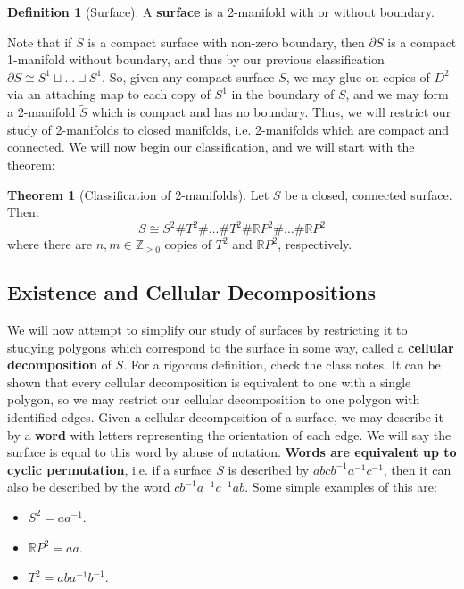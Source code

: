 \documentclass[11pt, oneside]{amsart}   	%
\theoremstyle{definition}
\newtheorem{definition}{Definition}[section]
\newtheorem{theorem}{Theorem}[section]
\begin{document}
	\begin{definition}[Surface]
		A \textbf{surface} is a 2-manifold with or without boundary.
	\end{definition}
	
	Note that if $S$ is a compact surface with non-zero boundary, then $\partial S$ is a compact 1-manifold without boundary, and thus by our previous 
	classification $\partial S\cong S^1\sqcup ...\sqcup S^1$. So, given any compact surface $S$, we may glue on copies of $D^2$ via an attaching map to each 
	copy of $S^1$ in the boundary of $S$, and we may form a 2-manifold $\tilde S$ which is compact and has no boundary. Thus, we will restrict our study of 
	2-manifolds to closed manifolds, i.e. 2-manifolds which are compact and connected. We will now begin our classification, and we will start with the theorem:
	
	\begin{theorem}[Classification of 2-manifolds]
		Let $S$ be a closed, connected surface. Then:
		$$
			S\cong S^2\# T^2\# ...\# T^2\#\mathbb RP^2\# ...\#\mathbb RP^2
		$$
		where there are $n, m\in\mathbb Z_{\geq 0}$ copies of $T^2$ and $\mathbb RP^2$, respectively.
	\end{theorem}
	
	\subsection{Existence and Cellular Decompositions}
	
	We will now attempt to simplify our study of surfaces by restricting it to studying polygons which correspond to the surface in some way, called a \textbf{cellular 
	decomposition} of $S$. For a rigorous definition, check the class notes. It can be shown that every cellular decomposition is equivalent to one with a single 
	polygon, so we may restrict our cellular decomposition to one polygon with identified edges. Given a cellular decomposition of a surface, we may describe it by 
	a \textbf{word} with letters representing the orientation of each edge. We will say the surface is equal to this word by abuse of notation. \textbf{Words are 
	equivalent up to cyclic permutation}, i.e. if a surface $S$ is described by $abcb^{-1}a^{-1}c^{-1}$, then it can also be described by the word $cb^{-1}a^{-1}c^{-1}
	ab$. Some simple examples of this are:
	\begin{itemize}
		\item $S^2 = aa^{-1}$.
		\item $\mathbb RP^2 = aa$.
		\item $T^2 = aba^{-1}b^{-1}$.
	\end{itemize}
	
\end{document}
